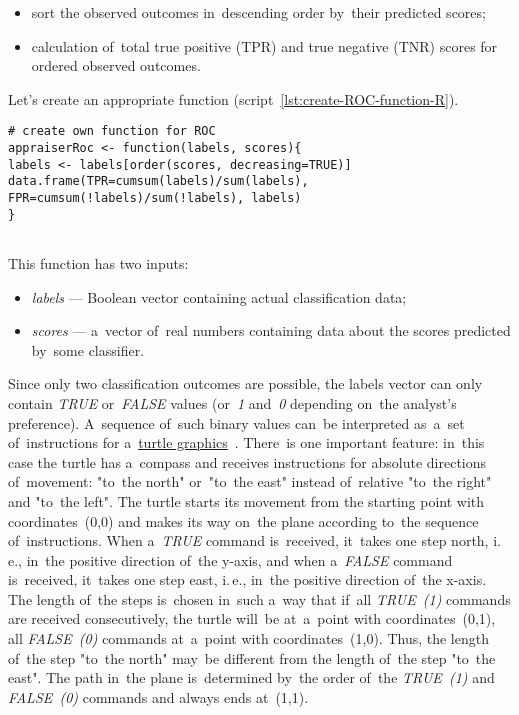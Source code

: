 \documentclass[]{scrreprt}
\begin{document}
\begin{itemize}
	\item sort the observed outcomes in~descending order by~their predicted scores;
	\item calculation of~total true positive (TPR) and true negative (TNR) scores for ordered observed outcomes.
\end{itemize}
Let's create an appropriate function (script~\ref{lst:create-ROC-function-R}).
%
\begin{lstlisting}[float=htp, caption = Creating a~function to~calculate TPR and FPR, firstnumber=1, label= lst:create-ROC-function-R]
# create own function for ROC
appraiserRoc <- function(labels, scores){
labels <- labels[order(scores, decreasing=TRUE)]
data.frame(TPR=cumsum(labels)/sum(labels),
FPR=cumsum(!labels)/sum(!labels), labels)
}
 
\end{lstlisting}
%
This function has two inputs:
\begin{itemize}
	\item \emph{labels} --- Boolean vector containing actual classification data;
	\item \emph{scores} --- a~vector of~real numbers containing data about the scores predicted by~some classifier.
\end{itemize}
%
Since only two classification outcomes are possible, the labels vector can only contain \emph{TRUE} or~\emph{FALSE} values (or~\emph{1} and~\emph{0} depending on~the analyst's preference). A~sequence of~such binary values can~be interpreted as~a~set of~instructions for a~\href{https://en.wikipedia.org/wiki/Turtle_graphics}{turtle graphics}~\cite{Wiki:turtle-graphics}. There~is one important feature: in~this case the turtle has a~compass and receives instructions for absolute directions of~movement: "to~the north" or~"to~the east" instead of~relative "to~the right" and "to~the left". The turtle starts its movement from the starting point with coordinates~(0,0) and makes its way on~the plane according to~the sequence of~instructions. When a~\emph{TRUE} command is~received, it~takes one step north, i.\,e., in~the positive direction of~the y-axis, and when a~\emph{FALSE} command is~received, it~takes one step east, i.\,e., in~the positive direction of~the x-axis. The length of~the steps is~chosen in~such a~way that if~all \emph{TRUE~(1)} commands are received consecutively, the turtle will~be at~a~point with coordinates~(0,1), all \emph{FALSE~(0)} commands at~a~point with coordinates~(1,0). Thus, the length of~the step "to~the north" may~be different from the length of~the step "to~the east". The path in~the plane is~determined by~the order of~the \emph{TRUE~(1)} and \emph{FALSE~(0)} commands and always ends at~(1,1).
\end{document}
